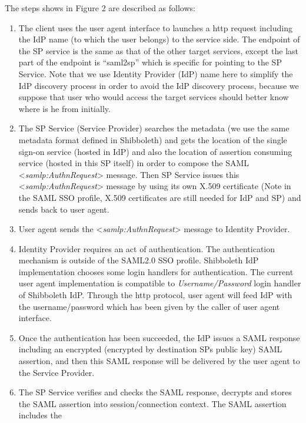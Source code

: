 \documentclass{article}
\newcommand\liststyleLv{%
\renewcommand\theenumi{\arabic{enumi}}
\renewcommand\theenumii{\arabic{enumii}}
\renewcommand\theenumiii{\arabic{enumiii}}
\renewcommand\theenumiv{\arabic{enumiv}}
\renewcommand\labelenumi{\theenumi.}
\renewcommand\labelenumii{\theenumii.}
\renewcommand\labelenumiii{\theenumiii.}
\renewcommand\labelenumiv{\theenumiv.}
}
\begin{document}
The steps shows in Figure 2 are described as follows:

\liststyleLv
\begin{enumerate}
\item The client uses the user agent interface to launches a http
request including the IdP name (to which the user belongs) to the
service side. The endpoint of the SP service is the same as that of the
other target services, except the last part of the endpoint is
{\textquotedblleft}saml2sp{\textquotedblright} which is specific for
pointing to the SP Service. Note that we use Identity Provider (IdP)
name here to simplify the IdP discovery process in order to avoid the
IdP discovery process, because we suppose that user who would access
the target services should better know where is he from initially.
\item The SP Service (Service Provider) searches the metadata (we use
the same metadata format defined in Shibboleth) and gets the location
of the single sign-on service (hosted in IdP) and also the location of
assertion consuming service (hosted in this SP itself) in order to
compose the SAML {\textless}\textit{samlp:AuthnRequest}{\textgreater}
message. Then SP Service issues this
{\textless}\textit{samlp:AuthnRequest}{\textgreater} message by using
its own X.509 certificate (Note in the SAML SSO profile, X.509
certificates are still needed for IdP and SP) and sends back to user
agent.
\item User agent sends the
{\textless}\textit{samlp:AuthnRequest}{\textgreater} message to
Identity Provider.
\item Identity Provider requires an act of authentication. The
authentication mechanism is outside of the SAML2.0 SSO profile.
Shibboleth IdP implementation chooses some login handlers for
authentication. The current user agent implementation is compatible to
\textit{Username/Password} login handler of Shibboleth IdP. Through the
http protocol, user agent will feed IdP with the username/password
which has been given by the caller of user agent interface.
\item Once the authentication has been succeeded, the IdP issues a SAML
response including an encrypted (encrypted by destination
SP{\textquotesingle}s public key) SAML assertion, and then this SAML
response will be delivered by the user agent to the Service Provider. 
\item The SP Service verifies and checks the SAML response, decrypts and
stores the SAML assertion into session/connection context. The SAML
assertion includes the

\end{enumerate}
\end{document}
